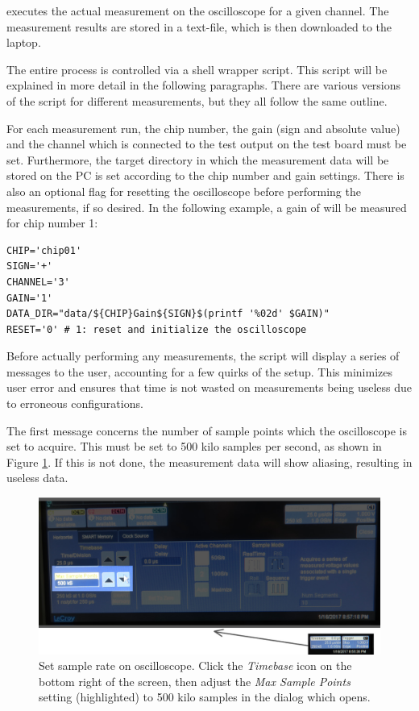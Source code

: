   executes   the  actual  measurement   on  the
oscilloscope  for a  given channel. The  measurement results  are stored  in a
text-file, which is then downloaded to the laptop.

The entire process is controlled via  a shell wrapper script. This script will
be explained  in more  detail in the  following paragraphs. There  are various
versions of  the script for  different measurements,  but they all  follow the
same outline.

For each measurement run, the chip  number, the gain (sign and absolute value)
and the channel which  is connected to the test output on  the test board must
be set.  Furthermore, the target directory  in which the measurement data will
be stored  on the PC is  set according to  the chip number and  gain settings.
There  is  also  an  optional  flag  for  resetting  the  oscilloscope  before
performing the measurements,  if so desired. In the following  example, a gain
of  will be measured for chip number 1:

\begin{verbatim}
CHIP='chip01'
SIGN='+'
CHANNEL='3'
GAIN='1'
DATA_DIR="data/${CHIP}Gain${SIGN}$(printf '%02d' $GAIN)"
RESET='0' # 1: reset and initialize the oscilloscope
\end{verbatim}

Before actually performing any measurements,  the script will display a series
of  messages to  the user,  accounting  for a  few quirks  of the  setup. This
minimizes user error and ensures that time is not wasted on measurements being
useless due to erroneous configurations.

The first message concerns the number  of sample points which the oscilloscope
is set to acquire. This  must be set to \num{500} kilo  samples per second, as
shown in  Figure \ref{fig:kilosamples}. If this  is not done,  the measurement
data will show aliasing, resulting in useless data.

\begin{figure}
    \centering
    \includegraphics[width=\textwidth]{images/expSetup/setSamples.jpeg}
    \caption{%
        Set sample rate on oscilloscope. Click the \emph{Timebase} icon on the
        bottom right of  the screen, then adjust the  \emph{Max Sample Points}
        setting (highlighted)  to \num{500} kilo  samples in the  dialog which
        opens.%
    }
    \label{fig:kilosamples}
\end{figure}

